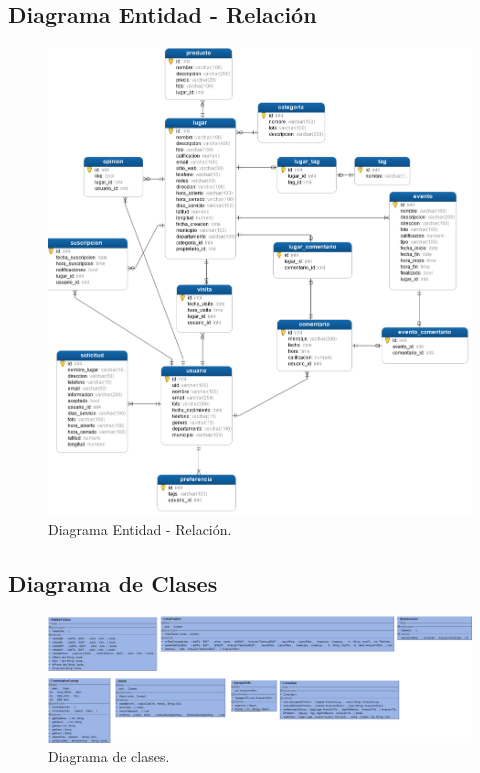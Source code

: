 \documentclass[12pt,letterpaper,openany]{book}
\begin{document}
\subsection{Diagrama Entidad - Relación}
\begin{figure}[H]
\begin{center}
\includegraphics[width=16cm]{./imagenes/Diagrama_entidad_relacion}
\caption{Diagrama Entidad - Relación.}
\end{center}
\end{figure}

\subsection{Diagrama de Clases}
\begin{figure}[H]
\begin{center}
\includegraphics[width=16cm]{./imagenes/diagrama_clases}
\caption{Diagrama de clases.}
\end{center}
\end{figure}
\end{document}
